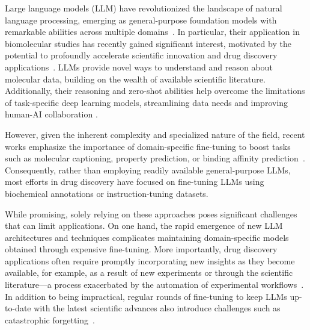 Large language models (LLM) have revolutionized the landscape of natural language processing, emerging as general-purpose foundation models with remarkable abilities across multiple  domains~\cite{achiam2023gpt,touvron2023llama}.
In particular, their application in biomolecular studies has recently gained significant interest, motivated by the potential to profoundly accelerate scientific innovation and drug discovery applications~\cite{zhang2024scientific,pei2024leveraging,chaves2024tx}. LLMs provide novel ways to understand and reason about molecular data, building on the wealth of available scientific literature. Additionally, their reasoning and zero-shot abilities help overcome the limitations of task-specific deep learning models, streamlining data needs and improving human-AI collaboration \cite{fang2023mol,yu2024llasmol}. 

However, given the inherent complexity and specialized nature of the field, recent works emphasize the importance of domain-specific fine-tuning to boost tasks such as molecular captioning, property prediction, or binding affinity prediction~\cite{fang2023mol,chaves2024tx,yu2024llasmol,edwards2024molcap}. Consequently, rather than employing readily available general-purpose LLMs, most efforts in drug discovery have focused on fine-tuning LLMs using biochemical annotations or instruction-tuning datasets.

While promising, solely relying on these approaches poses significant challenges that can limit applications.
On one hand, the rapid emergence of new LLM architectures and techniques \cite{minaee2024large,zhao2023survey} complicates maintaining domain-specific models obtained through expensive fine-tuning.
More importantly, drug discovery applications often require promptly incorporating new insights as they become available, for example, as a result of new experiments or through the scientific literature---a process exacerbated by the automation of experimental workflows~\cite{tom2024self}. In addition to being impractical, regular rounds of fine-tuning to keep LLMs up-to-date with the latest scientific advances also introduce challenges such as catastrophic forgetting~\cite{luo2023empirical}.


